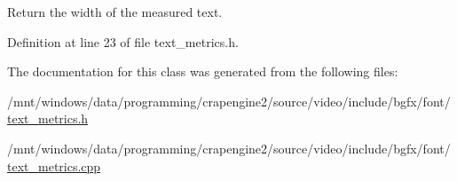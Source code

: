 Return the width of the measured text. 



Definition at line 23 of file text\+\_\+metrics.\+h.



The documentation for this class was generated from the following files\+:\begin{DoxyCompactItemize}
\item 
/mnt/windows/data/programming/crapengine2/source/video/include/bgfx/font/\hyperlink{text__metrics_8h}{text\+\_\+metrics.\+h}\item 
/mnt/windows/data/programming/crapengine2/source/video/include/bgfx/font/\hyperlink{text__metrics_8cpp}{text\+\_\+metrics.\+cpp}\end{DoxyCompactItemize}
